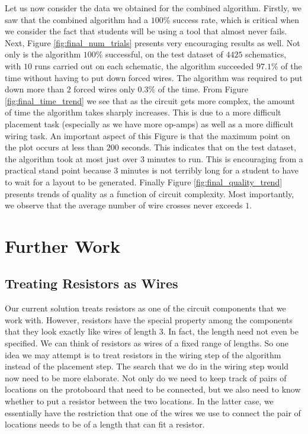 Let us now consider the data we obtained for the combined algorithm. Firstly, we
saw that the combined algorithm had a $100\%$ success rate, which is critical
when we consider the fact that students will be using a tool that almost never fails.
Next, Figure \ref{fig:final_num_trials} presents very encouraging results as well.
Not only is the algorithm $100\%$ successful, on the test dataset of $4425$
schematics, with $10$ runs carried out on each schematic, the algorithm succeeded
$97.1\%$ of the time without having to put down forced wires. The algorithm was
required to put down more than $2$ forced wires only $0.3\%$ of the time.
From Figure
\ref{fig:final_time_trend} we see that as the circuit gets more complex, the
amount of time the algorithm takes sharply increases. This is due to a more
difficult placement task (especially as we have more op-amps) as well as a more
difficult wiring task. An important aspect of this Figure is that the maximum
point on the plot occurs at less than $200$ seconds. This indicates that on the
test dataset, the algorithm took at most just over $3$ minutes to run. This is
encouraging from a practical stand point because $3$ minutes is not terribly long
for a student to have to wait for a layout to be generated.
Finally Figure \ref{fig:final_quality_trend} presents trends of quality as a
function of circuit complexity. Most importantly, we observe that the average
number of wire crosses never exceeds $1$.

\section{Further Work}

\subsection{Treating Resistors as Wires}

Our current solution treats resistors as one of the circuit components that we
work with. However, resistors have the special property among the components that
they look exactly like wires of length $3$.
In fact, the length need not even be specified.
We can think of resistors as wires of a fixed range of lengths. So one idea we
may attempt is to treat resistors in the wiring step of the algorithm instead of
the placement step. The search that we do in the wiring step would now need to be
more elaborate. Not only do we need to keep track of pairs of locations on the
protoboard that need to be connected, but we also need to know whether to put
a resistor between the two locations. In the latter case, we essentially have the
restriction that one of the wires we use to connect the pair of locations needs
to be of a length that can fit a resistor.

